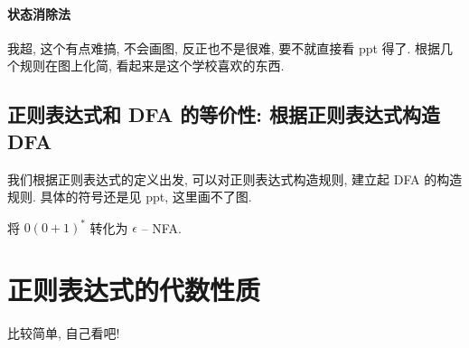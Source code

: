 \documentclass[../main_part1.tex]{subfiles}
\begin{document}
\paragraph{状态消除法} 
我超, 这个有点难搞, 不会画图, 反正也不是很难, 要不就直接看 ppt 得了. 根据几个规则在图上化简, 看起来是这个学校喜欢的东西. 

\subsection{正则表达式和 DFA 的等价性: 根据正则表达式构造 DFA}
我们根据正则表达式的定义出发, 可以对正则表达式构造规则, 建立起 DFA 的构造规则. 具体的符号还是见 ppt, 这里画不了图. 
\begin{exam}
将 \( 0 (0+1)^{*}\) 转化为 \(\epsilon\) -- NFA.
\end{exam}

\section{正则表达式的代数性质}\label{sec:3}
比较简单, 自己看吧!
\end{document}
